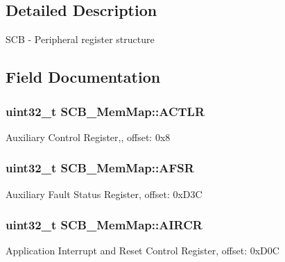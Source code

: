 \subsection{Detailed Description}
S\+C\+B -\/ Peripheral register structure 

\subsection{Field Documentation}
\hypertarget{struct_s_c_b___mem_map_a474a33074611146734690e48ed41282e}{}
\subsubsection[{A\+C\+T\+L\+R}]{\setlength{\rightskip}{0pt plus 5cm}uint32\+\_\+t S\+C\+B\+\_\+\+Mem\+Map\+::\+A\+C\+T\+L\+R}\label{struct_s_c_b___mem_map_a474a33074611146734690e48ed41282e}
Auxiliary Control Register,, offset\+: 0x8 \hypertarget{struct_s_c_b___mem_map_aa02bdd6294d9240a566fe92085f62ae1}{}
\subsubsection[{A\+F\+S\+R}]{\setlength{\rightskip}{0pt plus 5cm}uint32\+\_\+t S\+C\+B\+\_\+\+Mem\+Map\+::\+A\+F\+S\+R}\label{struct_s_c_b___mem_map_aa02bdd6294d9240a566fe92085f62ae1}
Auxiliary Fault Status Register, offset\+: 0x\+D3\+C \hypertarget{struct_s_c_b___mem_map_a3f874ca1c6e17ae4beadac22e8ec17ec}{}
\subsubsection[{A\+I\+R\+C\+R}]{\setlength{\rightskip}{0pt plus 5cm}uint32\+\_\+t S\+C\+B\+\_\+\+Mem\+Map\+::\+A\+I\+R\+C\+R}\label{struct_s_c_b___mem_map_a3f874ca1c6e17ae4beadac22e8ec17ec}
Application Interrupt and Reset Control Register, offset\+: 0x\+D0\+C \hypertarget{struct_s_c_b___mem_map_a57e3932788931280ee70b7389c4b23f4}{}
